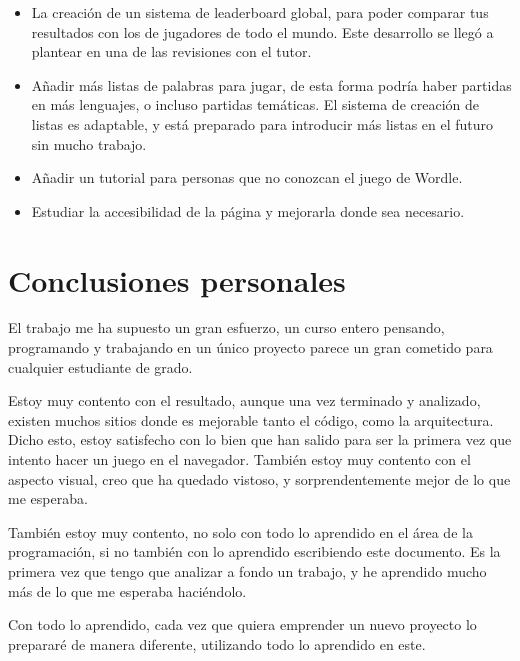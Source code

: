 \begin{itemize}
	\item La creación de un sistema de leaderboard global, para poder comparar tus resultados con los de jugadores de todo el mundo. Este desarrollo se llegó a plantear en una de las revisiones con el tutor.
	\item Añadir más listas de palabras para jugar, de esta forma podría haber partidas en más lenguajes, o incluso partidas temáticas. El sistema de creación de listas es adaptable, y está preparado para introducir más listas en el futuro sin mucho trabajo.
	\item Añadir un tutorial para personas que no conozcan el juego de Wordle.
	\item Estudiar la accesibilidad de la página y mejorarla donde sea necesario.
\end{itemize}


\section{Conclusiones personales}
El trabajo me ha supuesto un gran esfuerzo, un curso entero pensando, programando y trabajando en un único proyecto parece un gran cometido para cualquier estudiante de grado.

Estoy muy contento con el resultado, aunque una vez terminado y analizado, existen muchos sitios donde es mejorable tanto el código, como la arquitectura. Dicho esto, estoy satisfecho con lo bien que han salido para ser la primera vez que intento hacer un juego en el navegador. También estoy muy contento con el aspecto visual, creo que ha quedado vistoso, y sorprendentemente mejor de lo que me esperaba.

También estoy muy contento, no solo con todo lo aprendido en el área de la programación, si no también con lo aprendido escribiendo este documento. Es la primera vez que tengo que analizar a fondo un trabajo, y he aprendido mucho más de lo que me esperaba haciéndolo.

Con todo lo aprendido, cada vez que quiera emprender un nuevo proyecto lo prepararé de manera diferente, utilizando todo lo aprendido en este.
